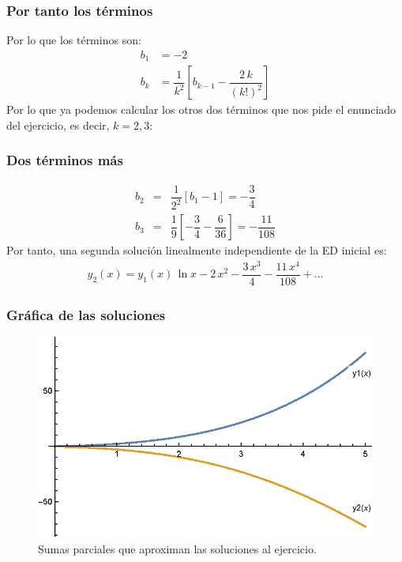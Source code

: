 \begin{frame}
\frametitle{Por tanto los términos}
Por lo que los términos son:
\begin{align*}
b_{1} &= -2 \\[0.5em]
b_{k} &= \dfrac{1}{k^{2}} \left[ b_{k-1} - \dfrac{2 \, k}{(k!)^{2}} \right]
\end{align*}
\pause
Por lo que ya podemos calcular los otros dos términos que nos pide el enunciado del ejercicio, es decir, $k = 2, 3$:
\end{frame}
\begin{frame}
\frametitle{Dos términos más}
\begin{eqnarray*}
b_{2} &=& \dfrac{1}{2^{2}} [b_{1} - 1] = - \dfrac{3}{4} \\[0.5em]
b_{3} &=& \dfrac{1}{9} \left[ -\dfrac{3}{4} - \dfrac{6}{36} \right] = - \dfrac{11}{108}
\end{eqnarray*}
\pause
Por tanto, una segunda solución linealmente independiente de la ED inicial es:
\begin{align*}
y_{2}(x) = y_{1}(x) \, \ln x - 2 \, x^{2} - \dfrac{3 \, x^{3}}{4} - \dfrac{11 \, x^{4}}{108} + \ldots
\end{align*}
\end{frame}
\begin{frame}
\frametitle{Gráfica de las soluciones}
\begin{figure}
   \centering
   \includegraphics[scale=1]{Imagenes/Segunda_Solucion_Series_01.eps}
   \caption{Sumas parciales que aproximan las soluciones al ejercicio.}
\end{figure}
\end{frame}
